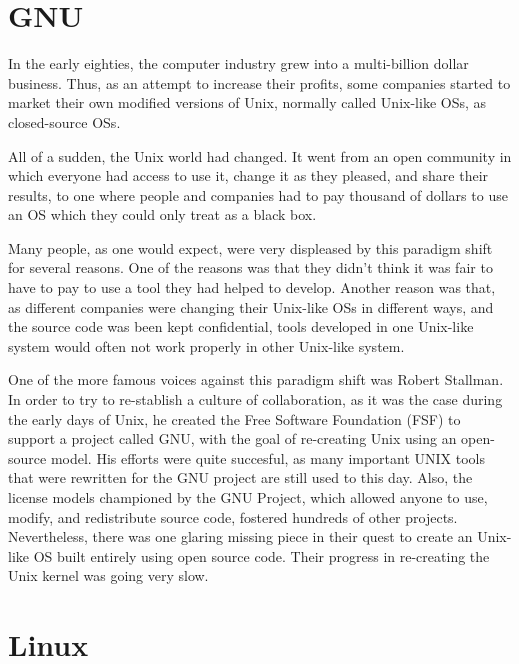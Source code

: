 \section{GNU}

In the early eighties, the computer industry grew into a multi-billion dollar business. Thus, as an attempt to increase their profits, some companies started to market their own modified versions of Unix, normally called Unix-like \acs{OS}s, as closed-source \acs{OS}s.

All of a sudden, the Unix world had changed. It went from an open community in which everyone had access to use it, change it as they pleased, and share their results, to one where people and companies had to pay thousand of dollars to use an \acs{OS} which they could only treat as a black box.

Many people, as one would expect, were very displeased by this paradigm shift for several reasons. One of the reasons was that they didn't think it was fair to have to pay to use a tool they had helped to develop. Another reason was that, as different companies were changing their Unix-like \acs{OS}s in different ways, and the source code was been kept confidential, tools developed in one Unix-like system would often not work properly in other Unix-like system.

One of the more famous voices against this paradigm shift was Robert Stallman. In order to try to re-stablish a culture of collaboration, as it was the case during the early days of Unix, he created the Free Software Foundation (\acs{FSF}) to support a project called \acs{GNU}, with the goal of re-creating Unix using an open-source model. His efforts were quite succesful, as many important UNIX tools that were rewritten for the \acs{GNU} project are still used to this day. Also, the license models championed by the GNU Project, which allowed anyone to use, modify, and redistribute source code, fostered hundreds of other projects. Nevertheless, there was one glaring missing piece in their quest to create an Unix-like \acs{OS} built entirely using open source code. Their progress in re-creating the Unix kernel was going very slow.

\section{Linux}

